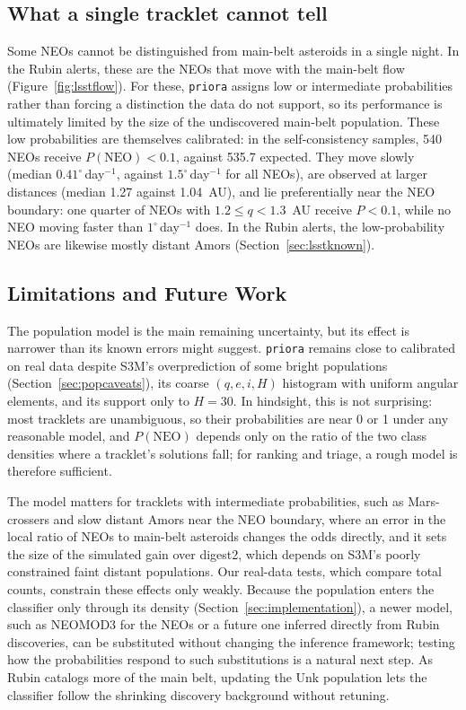 \documentclass[linenumbers,twocolumn]{aastex701}
\newcommand{\priora}{{\tt priora}\xspace} %
\begin{document}
\subsection{What a single tracklet cannot tell}
\label{sec:lowp}

Some NEOs cannot be distinguished from main-belt asteroids in a single
night. In the Rubin alerts, these are the NEOs that move with the main-belt flow
(Figure~\ref{fig:lsstflow}).  For these, \priora assigns low or intermediate probabilities rather
than forcing a distinction the data do not support, so its performance is
ultimately limited by the size of the undiscovered main-belt population.
These low probabilities are themselves calibrated: in the self-consistency
samples, 540 NEOs receive $P(\mathrm{NEO})<0.1$, against 535.7 expected.
They move slowly (median $0.41^\circ$\,day$^{-1}$, against
$1.5^\circ$\,day$^{-1}$ for all NEOs), are observed at larger distances
(median 1.27 against 1.04~AU), and lie preferentially near the NEO boundary:
one quarter of NEOs with $1.2\leq q<1.3$~AU receive $P<0.1$, while no NEO
moving faster than $1^\circ$\,day$^{-1}$ does. In the Rubin alerts, the
low-probability NEOs are likewise mostly distant Amors
(Section~\ref{sec:lsstknown}).

\subsection{Limitations and Future Work}
\label{sec:limits}

The population model is the main remaining uncertainty, but its effect is
narrower than its known errors might suggest. \priora remains close to
calibrated on real data despite S3M's overprediction of some bright
populations (Section~\ref{sec:popcaveats}), its coarse $(q,e,i,H)$
histogram with uniform angular elements, and its support only to $H=30$.
In hindsight, this is not surprising: most tracklets are unambiguous, so their probabilities
are near 0 or 1 under any reasonable model, and $P(\mathrm{NEO})$ depends
only on the ratio of the two class densities where a tracklet's solutions
fall; for ranking and triage, a rough model is therefore sufficient.

The
model matters for tracklets with intermediate probabilities, such as
Mars-crossers and slow distant Amors near the NEO boundary, where an error
in the local ratio of NEOs to main-belt asteroids changes the odds
directly, and it sets the size of the simulated gain over digest2, which
depends on S3M's poorly constrained faint distant populations. Our
real-data tests, which compare total counts, constrain these effects only
weakly. Because the population enters the classifier only through its
density (Section~\ref{sec:implementation}), a newer model, such as
NEOMOD3 \citep{nesvorny2024} for the NEOs or a future one inferred directly from Rubin discoveries, can
be substituted without changing the inference framework; testing how
the probabilities respond to such substitutions is a natural next step. As
Rubin catalogs more of the main belt, updating the Unk population lets the
classifier follow the shrinking discovery background without retuning.
\end{document}
